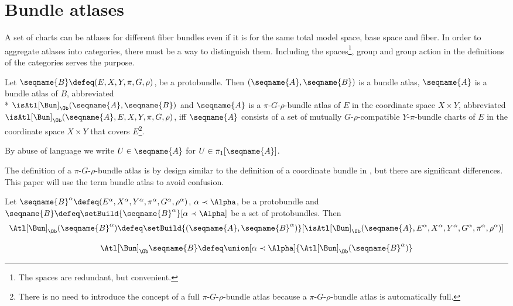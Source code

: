 \documentclass{article}
\begin{document}
\section{Bundle atlases}
\label{sec:BunAtlases}
A set of charts can be atlases for different fiber bundles even if it is
for the same total model space, base space and fiber. In order to
aggregate atlases into categories, there must be a way to distinguish
them. Including the spaces\footnote{
The spaces are redundant, but convenient.},
group and group action in the definitions of the categories serves the
purpose.

\begin{definition}
\label{def:Bun-Atl}
Let $\seqname{B} \defeq (E, X, Y, \pi, G, \rho)$, be a protobundle. Then
$(\seqname{A},\seqname{B})$ is a bundle atlas, $\seqname{A}$ is a bundle
atlas of $B$, abbreviated \\*
$\isAtl[\Bun]_\Ob(\seqname{A}, \seqname{B})$
and $\seqname{A}$ is a $\pi$-$G$-$\rho$-bundle atlas of $E$ in the
coordinate space $X \times Y$, abbreviated
$\isAtl[\Bun]_\Ob(\seqname{A}, E, X, Y, \pi, G, \rho)$, iff
$\seqname{A}$ consists of a set of mutually $G$-$\rho$-compatible
$Y$-$\pi$-bundle charts of $E$ in the coordinate space $X \times Y$ that
covers $E$\footnote{
  There is no need to introduce the concept of a full
  $\pi$-$G$-$\rho$-bundle atlas because a $\pi$-$G$-$\rho$-bundle
  atlas is automatically full.
}.

By abuse of language we write $U \in \seqname{A}$ for
$U \in \pi_1[\seqname{A}]$.

\begin{remark}
The definition of a $\pi$-$G$-$\rho$-bundle atlas is by design similar
to the definition of a coordinate bundle in \cite[p.~7]{TopFib}, but
there are significant differences. This paper will use the term bundle
atlas to avoid confusion.
\end{remark}

Let
$
  \seqname{B}^\alpha \defeq
  (E^\alpha, X^\alpha, Y^\alpha, \pi^\alpha, G^\alpha, \rho^\alpha)
$,
$\alpha \prec \Alpha$, be a protobundle and
$\seqname{B} \defeq \setBuild{{\seqname{B}^\alpha}}[\alpha \prec \Alpha]$
be a set of protobundles.
Then
\begin{multline}
\Atl[\Bun]_\Ob(\seqname{B}^\alpha) \defeq
  \setBuild
  {{
    (
      \seqname{A},
      \seqname{B}^\alpha
    )
  }}%
  [
    {{
      \isAtl[\Bun]_\Ob
        (
          \seqname{A},
          E^\alpha,
          X^\alpha,
          Y^\alpha,
          G^\alpha,
          \pi^\alpha,
          \rho^\alpha
        )
    }}
  ]
\end{multline}

\begin{equation}
\Atl[\Bun]_\Ob \seqname{B} \defeq
  \union[\alpha \prec \Alpha]{\Atl[\Bun]_\Ob(\seqname{B}^\alpha)}
\end{equation}
\end{definition}
\end{document}
